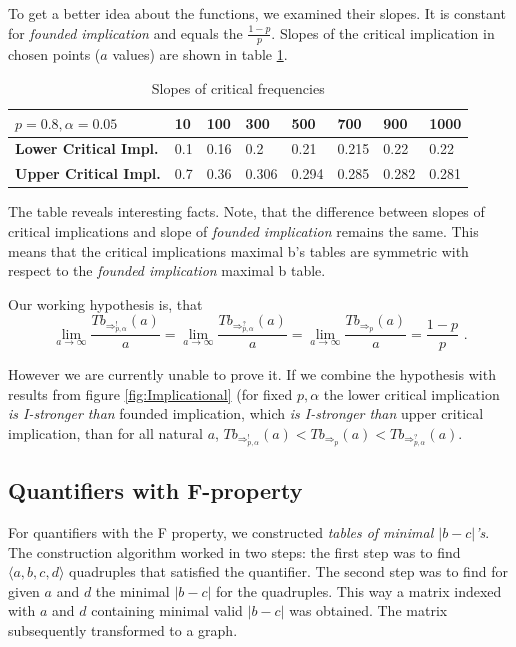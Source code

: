 To get a better idea about the functions, we examined their slopes. It is constant for \emph{founded implication} and equals the $\frac{1-p}{p}$. Slopes of the critical implication in chosen points ($a$ values) are shown in table \ref{tab:slopes}.

\begin{table}[ht]
	\centering
	\caption{Slopes of critical frequencies}	
		\label{tab:slopes}
		\begin{tabular}{|p{4cm}|p{1cm}|p{1cm}|p{1cm}|p{1cm}|p{1cm}|p{1cm}|p{1cm}|}
			\hline
			$p=0.8, \alpha=0.05$
			 &\textbf{10}&\textbf{100}&\textbf{300}&\textbf{500}&\textbf{700}&\textbf{900}&\textbf{1000}\\
			\hline
			\textbf{Lower Critical Impl.}&0.1&0.16&0.2&0.21&0.215&0.22&0.22\\
			\hline
			\textbf{Upper Critical Impl.}&0.7&0.36&0.306&0.294&0.285&0.282&0.281\\
			\hline
		\end{tabular}
\end{table}

The table reveals interesting facts. Note, that the difference between slopes of critical implications and slope of \emph{founded implication} remains the same. This means that the critical implications maximal b's tables are symmetric with respect to the \emph{founded implication} maximal b table. 

Our working hypothesis is, that 
%
%
$$\lim_{a\rightarrow\infty} \frac{Tb_{\Rightarrow^{!}_{p, \alpha}}(a)}{a} = \lim_{a\rightarrow\infty} \frac{Tb_{\Rightarrow^{?}_{p, \alpha}}(a)}{a} = \lim_{a\rightarrow\infty} \frac{Tb_{\Rightarrow_{p}}(a)}{a} = %
\frac{1-p}{p} \mbox{ .}$$ 

However we are currently unable to prove it. If we combine the hypothesis with results from figure \ref{fig:Implicational} (for fixed $p, \alpha$ the lower critical implication \emph{is I-stronger than} founded implication, which \emph{is I-stronger than} upper critical implication, than for all natural $a$, 
$Tb_{\Rightarrow^{!}_{p, \alpha}}(a) < Tb_{\Rightarrow_{p}}(a) < Tb_{\Rightarrow^{?}_{p, \alpha}}(a)$.

\subsection{Quantifiers with F-property}
For quantifiers with the F property, we constructed \emph{tables of minimal $|b-c|$'s}. The construction algorithm worked in two steps: the first step was to find $\langle a,b,c,d \rangle$ quadruples that satisfied the quantifier. The second step was to find for given $a$ and $d$ the minimal $|b-c|$ for the quadruples. This way a matrix indexed with $a$ and $d$ containing minimal valid $|b-c|$ was obtained. The matrix subsequently transformed to a graph. 

